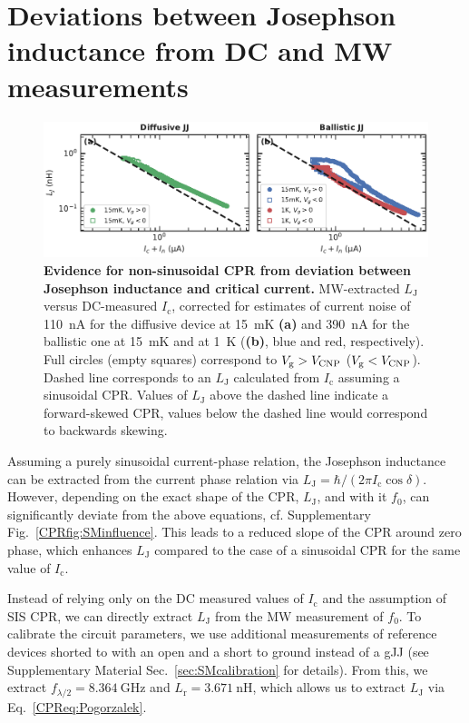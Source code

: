 \section{Deviations between Josephson inductance from DC and MW measurements}

\begin{figure}[t]
	\centering
	\includegraphics[width=\linewidth]{chapter-gJJ-CPR/figs/SMFigure2}
	\caption{
		\textbf{Evidence for non-sinusoidal CPR from deviation between Josephson inductance and critical current.}
		MW-extracted $L_\text{J}$ versus DC-measured $I_\text{c}$, corrected for estimates of current noise of \SI{110}{\nano\ampere} for the diffusive device at \SI{15}{\milli\kelvin} \textbf{(a)} and \SI{390}{\nano\ampere} for the ballistic one at \SI{15}{\milli\kelvin} and at \SI{1}{\kelvin} (\textbf{(b)}, blue and red, respectively).
		Full circles (empty squares) correspond to $V_\text{g}>V_{\rm CNP}$ ($V_\text{g}<V_{\rm CNP}$).
		Dashed line corresponds to an $L_\text{J}$ calculated from $I_\text{c}$ assuming a sinusoidal CPR.
		Values of $L_\text{J}$ above the dashed line indicate a forward-skewed CPR, values below the dashed line would correspond to backwards skewing.
	}
	\label{CPRfig:figure2}
\end{figure}

Assuming a purely sinusoidal current-phase relation, the Josephson inductance can be extracted from the current phase relation via $L_\text{J} = \hbar/(2\pi I_\text{c} \cos\delta)$.
%
However, depending on the exact shape of the CPR, $L_\text{J}$, and with it $f_0$, can significantly deviate from the above equations, cf. Supplementary Fig.~\ref{CPRfig:SMinfluence}.
%
This leads to a reduced slope of the CPR around zero phase, which enhances $L_\text{J}$ compared to the case of a sinusoidal CPR for the same value of $I_\text{c}$.

Instead of relying only on the DC measured values of $I_\text{c}$ and the assumption of SIS CPR, we can directly extract $L_\text{J}$ from the MW measurement of $f_0$.
%
To calibrate the circuit parameters, we use additional measurements of reference devices shorted to with an open and a short to ground instead of a gJJ (see Supplementary Material Sec.~\ref{sec:SMcalibration} for details).
%
From this, we extract $f_{\lambda/2}=\SI{8.364}{\giga\hertz}$ and $L_\text{r}=\SI{3.671}{\nano\henry}$, which allows us to extract $L_\text{J}$ via Eq.~\ref{CPReq:Pogorzalek}.

